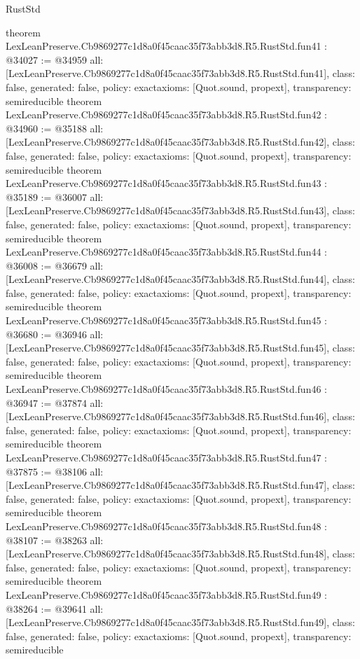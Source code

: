 \begin{lexlean}{RustStd}
\begin{coremodule}
{}
theorem LexLeanPreserve.Cb9869277c1d8a0f45caac35f73abb3d8.R5.RustStd.fun41 : @34027 := @34959 {
  all: [LexLeanPreserve.Cb9869277c1d8a0f45caac35f73abb3d8.R5.RustStd.fun41],
  class: false,
  generated: false,
  policy: exact{axioms: [Quot.sound, propext]},
  transparency: semireducible
}
theorem LexLeanPreserve.Cb9869277c1d8a0f45caac35f73abb3d8.R5.RustStd.fun42 : @34960 := @35188 {
  all: [LexLeanPreserve.Cb9869277c1d8a0f45caac35f73abb3d8.R5.RustStd.fun42],
  class: false,
  generated: false,
  policy: exact{axioms: [Quot.sound, propext]},
  transparency: semireducible
}
theorem LexLeanPreserve.Cb9869277c1d8a0f45caac35f73abb3d8.R5.RustStd.fun43 : @35189 := @36007 {
  all: [LexLeanPreserve.Cb9869277c1d8a0f45caac35f73abb3d8.R5.RustStd.fun43],
  class: false,
  generated: false,
  policy: exact{axioms: [Quot.sound, propext]},
  transparency: semireducible
}
theorem LexLeanPreserve.Cb9869277c1d8a0f45caac35f73abb3d8.R5.RustStd.fun44 : @36008 := @36679 {
  all: [LexLeanPreserve.Cb9869277c1d8a0f45caac35f73abb3d8.R5.RustStd.fun44],
  class: false,
  generated: false,
  policy: exact{axioms: [Quot.sound, propext]},
  transparency: semireducible
}
theorem LexLeanPreserve.Cb9869277c1d8a0f45caac35f73abb3d8.R5.RustStd.fun45 : @36680 := @36946 {
  all: [LexLeanPreserve.Cb9869277c1d8a0f45caac35f73abb3d8.R5.RustStd.fun45],
  class: false,
  generated: false,
  policy: exact{axioms: [Quot.sound, propext]},
  transparency: semireducible
}
theorem LexLeanPreserve.Cb9869277c1d8a0f45caac35f73abb3d8.R5.RustStd.fun46 : @36947 := @37874 {
  all: [LexLeanPreserve.Cb9869277c1d8a0f45caac35f73abb3d8.R5.RustStd.fun46],
  class: false,
  generated: false,
  policy: exact{axioms: [Quot.sound, propext]},
  transparency: semireducible
}
theorem LexLeanPreserve.Cb9869277c1d8a0f45caac35f73abb3d8.R5.RustStd.fun47 : @37875 := @38106 {
  all: [LexLeanPreserve.Cb9869277c1d8a0f45caac35f73abb3d8.R5.RustStd.fun47],
  class: false,
  generated: false,
  policy: exact{axioms: [Quot.sound, propext]},
  transparency: semireducible
}
theorem LexLeanPreserve.Cb9869277c1d8a0f45caac35f73abb3d8.R5.RustStd.fun48 : @38107 := @38263 {
  all: [LexLeanPreserve.Cb9869277c1d8a0f45caac35f73abb3d8.R5.RustStd.fun48],
  class: false,
  generated: false,
  policy: exact{axioms: [Quot.sound, propext]},
  transparency: semireducible
}
theorem LexLeanPreserve.Cb9869277c1d8a0f45caac35f73abb3d8.R5.RustStd.fun49 : @38264 := @39641 {
  all: [LexLeanPreserve.Cb9869277c1d8a0f45caac35f73abb3d8.R5.RustStd.fun49],
  class: false,
  generated: false,
  policy: exact{axioms: [Quot.sound, propext]},
  transparency: semireducible
}
\end{coremodule}
\end{lexlean}
